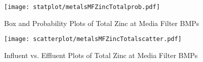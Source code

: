         \begin{figure}[hb]   %
            \centering
            \texttt{[image: statplot/metalsMFZincTotalprob.pdf]}
            \caption{Box and Probability Plots of Total Zinc at Media Filter BMPs}
        \end{figure}         %
        
        
        \begin{figure}[hb]   %
            \centering
            \texttt{[image: scatterplot/metalsMFZincTotalscatter.pdf]}
            \caption{Influent vs. Effluent Plots of Total Zinc at Media Filter BMPs}
        \end{figure}         %
        \clearpage
        